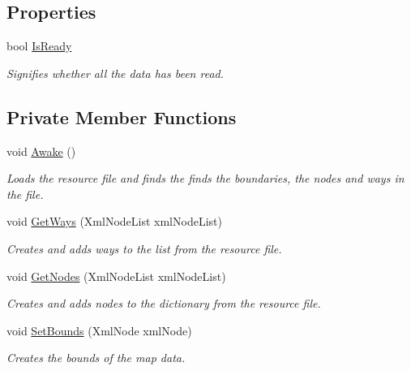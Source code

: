 \subsection*{Properties}
\begin{DoxyCompactItemize}
\item 
bool \mbox{\hyperlink{class_map_reader_a32d4f6e5c247548b2780e4103a389ed7}{Is\+Ready}}
\begin{DoxyCompactList}\small\item\em Signifies whether all the data has been read. \end{DoxyCompactList}\end{DoxyCompactItemize}
\subsection*{Private Member Functions}
\begin{DoxyCompactItemize}
\item 
void \mbox{\hyperlink{class_map_reader_abd81ae4208520c05740a0c6e9123f0c7}{Awake}} ()
\begin{DoxyCompactList}\small\item\em Loads the resource file and finds the finds the boundaries, the nodes and ways in the file. \end{DoxyCompactList}\item 
void \mbox{\hyperlink{class_map_reader_a483bef8b5e6eb6a495e6be83891cadb0}{Get\+Ways}} (Xml\+Node\+List xml\+Node\+List)
\begin{DoxyCompactList}\small\item\em Creates and adds ways to the list from the resource file. \end{DoxyCompactList}\item 
void \mbox{\hyperlink{class_map_reader_a30a5de63f453fd1f3e2160916126331b}{Get\+Nodes}} (Xml\+Node\+List xml\+Node\+List)
\begin{DoxyCompactList}\small\item\em Creates and adds nodes to the dictionary from the resource file. \end{DoxyCompactList}\item 
void \mbox{\hyperlink{class_map_reader_a35c17d19f80254a34257192f90688592}{Set\+Bounds}} (Xml\+Node xml\+Node)
\begin{DoxyCompactList}\small\item\em Creates the bounds of the map data. \end{DoxyCompactList}\end{DoxyCompactItemize}
